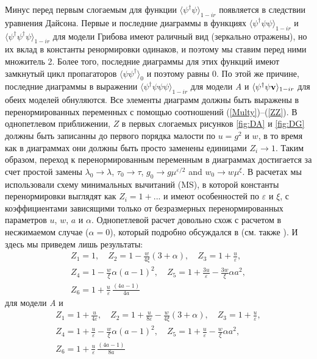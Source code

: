\documentclass[a4paper,10pt]{article}
\begin{document}
Минус перед первым слогаемым для функции $\langle \psi^{\dag} \psi \rangle_{1-ir}$ появляется в следствии уравнения Дайсона.
Первые и последние диаграммы в функциях
$\langle \psi^{\dag} \psi \psi  \rangle_{1-ir}$ и
$\langle \psi^{\dag} \psi^{\dag} \psi \rangle_{1-ir}$ для модели Грибова
имеют раличный вид (зеркально отражены), но их вклад в константы ренормировки одинаков, и поэтому мы ставим перед ними множитель 2.
Более того, последние диаграммы для этих функций имеют замкнутый цикл пропагаторов $\langle \psi \psi^{\dag} \rangle_{0}$ и поэтому равны $0$.
По этой же причине, последние диаграммы в выражении $\langle \psi^{\dag} \psi \psi \psi  \rangle_{1-ir}$ для модели {\it A}
и $\langle \psi^{\dag}\psi {\bf v} \rangle_{1-ir}$ для обеих моделей обнуляются.
Все элементы диаграмм должны быть выражены в перенормированных переменных с помощью соотношений  (\ref{Multy})--(\ref{ZZ}).
В однопетлевом приближении,  $Z$  в первых слогаемых рисунков  \ref{fig:DA} и  \ref{fig:DG}  должны быть записанны   до первого порядка малости по $u= g^{2}$
и $w$, в то время как в диаграммах они должны быть просто заменены единицами $Z_{i} \to 1$.
Таким образом, переход к перенормированным переменным в диаграммах достигается за счет простой замены $\lambda_{0} \to \lambda$, $\tau_{0} \to \tau$,
$g_{0} \to g\mu^{\varepsilon/2}$ and $w_{0} \to w\mu^{\xi}$.
В расчетах мы использовали схему минимальных вычитаний (MS), в которой константы перенормировки выглядят как  $Z_{i}=1+...$  и имеют  особенностей  по $\varepsilon$ и $\xi$,
с коэффициентами зависящими только от безразмерных  перенормированных параметров $u$, $w$, $a$ и $\alpha$.
Однопетлевой расчет довольно схож с расчетом в несжимаемом случае ($\alpha=0$), который подробно обсуждался в  \cite{AIK} (см. также  \cite{AHH,Alexa}).
 И здесь мы приведем лишь результаты:
\begin{eqnarray}
Z_{1} = 1, \quad  Z_{2} = 1 - \frac{w}{4\xi}(3+\alpha), \quad
Z_{3} = 1 + \frac{u}{\varepsilon}, \nonumber \\
Z_{4} = 1 - \frac{w}{\xi} \alpha (a-1)^{2} , \quad
Z_{5} = 1 + \frac{3u}{\varepsilon} - \frac{3w}{\xi} \alpha a^{2},
\nonumber \\
Z_{6} = 1 + \frac{u}{\varepsilon}\, \frac{(4a-1)}{4a}
\label{ZoA}
\end{eqnarray}
для модели {\it A} и
\begin{eqnarray}
Z_{1} = 1 + \frac{u}{4\varepsilon}, \quad
Z_{2} = 1 + \frac{u}{8\varepsilon} - \frac{w}{4\xi}(3+\alpha), \quad
Z_{3} = 1 + \frac{u}{\varepsilon}, \nonumber \\
Z_{4} = 1 + \frac{u}{\varepsilon} - \frac{w}{\xi} \alpha (a-1)^{2} , \quad
Z_{5} = 1 + \frac{u}{\varepsilon} - \frac{w}{\xi} \alpha a^{2}, \nonumber \\
Z_{6} = 1 + \frac{u}{\varepsilon}\, \frac{(4a-1)}{8a}
\label{ZoG}
\end{eqnarray}
\end{document}
